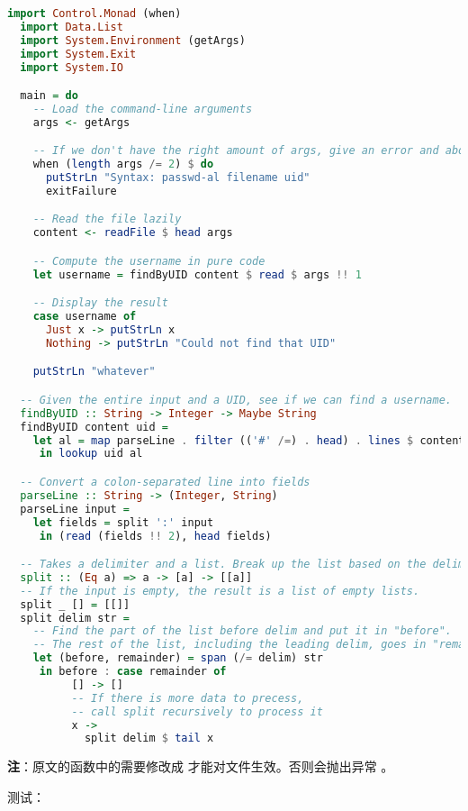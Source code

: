 \documentclass[./main.tex]{subfiles}
\begin{document}
\begin{lstlisting}[language=Haskell]
  import Control.Monad (when)
  import Data.List
  import System.Environment (getArgs)
  import System.Exit
  import System.IO

  main = do
    -- Load the command-line arguments
    args <- getArgs

    -- If we don't have the right amount of args, give an error and abort
    when (length args /= 2) $ do
      putStrLn "Syntax: passwd-al filename uid"
      exitFailure

    -- Read the file lazily
    content <- readFile $ head args

    -- Compute the username in pure code
    let username = findByUID content $ read $ args !! 1

    -- Display the result
    case username of
      Just x -> putStrLn x
      Nothing -> putStrLn "Could not find that UID"

    putStrLn "whatever"

  -- Given the entire input and a UID, see if we can find a username.
  findByUID :: String -> Integer -> Maybe String
  findByUID content uid =
    let al = map parseLine . filter (('#' /=) . head) . lines $ content
     in lookup uid al

  -- Convert a colon-separated line into fields
  parseLine :: String -> (Integer, String)
  parseLine input =
    let fields = split ':' input
     in (read (fields !! 2), head fields)

  -- Takes a delimiter and a list. Break up the list based on the delimiter.
  split :: (Eq a) => a -> [a] -> [[a]]
  -- If the input is empty, the result is a list of empty lists.
  split _ [] = [[]]
  split delim str =
    -- Find the part of the list before delim and put it in "before".
    -- The rest of the list, including the leading delim, goes in "remainder".
    let (before, remainder) = span (/= delim) str
     in before : case remainder of
          [] -> []
          -- If there is more data to precess,
          -- call split recursively to process it
          x ->
            split delim $ tail x
\end{lstlisting}

\textbf{注}：原文的函数中的需要修改成
才能对文件生效。否则会抛出异常
。

测试：
\end{document}
